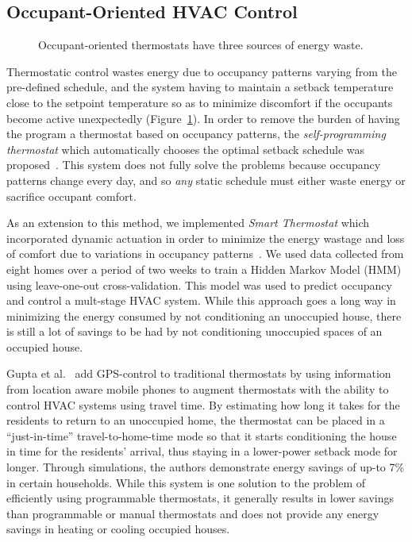 \subsection{Occupant-Oriented HVAC Control} 
\label{sec:occupantOrientedHVACControl}
\begin{figure}[t]
 \caption[Drawbacks of Occupant-oriented Thermostats]{Occupant-oriented thermostats have three sources of energy waste.} 
\label{fig:overviewReactive}
\end{figure}

Thermostatic control wastes energy due to occupancy patterns varying from the
pre-defined schedule, and the system having to maintain a setback temperature
close to the setpoint temperature so as to minimize discomfort if the occupants
become active unexpectedly (Figure~\ref{fig:overviewReactive}). In order to
remove the burden of having the program a thermostat based on occupancy
patterns, the {\em self-programming thermostat} which automatically chooses the
optimal setback schedule was proposed~\cite{gao2009self}. This system does not
fully solve the problems because occupancy patterns change every day, and so
{\em any} static schedule must either waste energy or sacrifice occupant
comfort.

As an extension to this method, we implemented {\em Smart Thermostat} which
incorporated dynamic actuation in order to minimize the energy wastage and loss
of comfort due to variations in occupancy patterns~\cite{Lu2010}. We used data
collected from eight homes over a period of two weeks to train a Hidden Markov
Model (HMM) using leave-one-out cross-validation. This model was used to predict
occupancy and control a mult-stage HVAC system. While this approach goes a long
way in minimizing the energy consumed by not conditioning an unoccupied house,
there is still a lot of savings to be had by not conditioning unoccupied spaces
of an occupied house.

Gupta et al.~\cite{gupta2009adding} add GPS-control to traditional thermostats
by using information from location aware mobile phones to augment thermostats
with the ability to control HVAC systems using travel time. By estimating how
long it takes for the residents to return to an unoccupied home, the thermostat
can be placed in a ``just-in-time'' travel-to-home-time mode so that it starts
conditioning the house in time for the residents' arrival, thus staying in a
lower-power setback mode for longer. Through simulations, the authors
demonstrate energy savings of up-to 7\% in certain households. While this system
is one solution to the problem of efficiently using programmable thermostats, it
generally results in lower savings than programmable or manual thermostats and
does not provide any energy savings in heating or cooling occupied houses.

